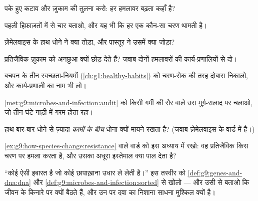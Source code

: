 \begin{exercise}[$\star$]\label{exo:g9:microbes-and-infection:4}
पके हुए कटाव और ज़ुकाम की तुलना करो: हर हमलावर बढ़ता कहाँ है?
\end{exercise}

\begin{exercise}[$\star$]\label{exo:g9:microbes-and-infection:5}
पहली हिफ़ाज़तों में से चार बताओ, और यह भी कि हर एक कौन-सा चरण थामती है।
\end{exercise}

\begin{exercise}[$\star$]\label{exo:g9:microbes-and-infection:6}
ज़ेमेलवाइस के हाथ धोने ने क्या तोड़ा, और पास्तूर ने उसमें क्या जोड़ा?
\end{exercise}

\begin{exercise}[$\star\star$]\label{exo:g9:microbes-and-infection:7}
प्रतिजैविक ज़ुकाम को अनछुआ क्यों छोड़ देते हैं? जवाब दोनों हमलावरों की
कार्य-प्रणालियों से दो।
\end{exercise}

\begin{exercise}[$\star\star$]\label{exo:g9:microbes-and-infection:8}
बचपन के तीन स्वच्छता-नियमों (\cref{ch:g1:healthy-habits}) को चरण-रोक की
तरह दोबारा निकालो, और कार्य-प्रणाली का नाम भी लो।
\end{exercise}

\begin{exercise}[$\star\star$]\label{exo:g9:microbes-and-infection:9}
\cref{met:g9:microbes-and-infection:audit} को किसी गर्मी की सैर वाले उस
मुर्ग़-सलाद पर चलाओ, जो तीन घंटे गाड़ी में गरम होता रहा।
\end{exercise}

\begin{exercise}[$\star\star$]\label{exo:g9:microbes-and-infection:10}
हाथ बार-बार धोने से ज़्यादा \emph{कामों के बीच} धोना क्यों मायने रखता
है? (जवाब ज़ेमेलवाइस के वार्ड में है।)
\end{exercise}

\begin{exercise}[$\star\star$]\label{exo:g9:microbes-and-infection:11}
\cref{ex:g9:how-species-change:resistance} वाले वार्ड को इस अध्याय में
रखो: वह प्रतिजैविक किस चरण पर हमला करता है, और उसका अधूरा इस्तेमाल क्या
पाल देता है?
\end{exercise}

\begin{exercise}[$\star\star\star$]\label{exo:g9:microbes-and-infection:12}
``कोई  ऐसी इबारत है जो कोई छापाख़ाना उधार ले लेती है।'' इस तस्वीर
को \cref{def:g9:genes-and-dna:dna} और
\cref{def:g9:microbes-and-infection:sorted} से खोलो --- और उसी से बताओ
कि  जीवन के किनारे पर क्यों बैठते हैं, और उन पर दवा का निशाना साधना
मुश्किल क्यों है।
\end{exercise}

